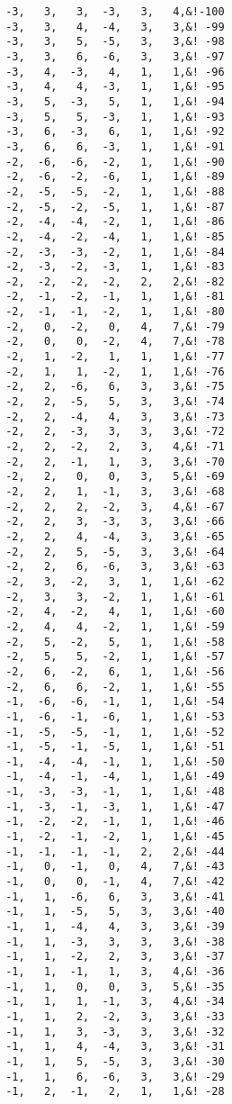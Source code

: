 \begin{Verbatim}
 -3,   3,   3,  -3,   3,   4,&!-100
 -3,   3,   4,  -4,   3,   3,&! -99
 -3,   3,   5,  -5,   3,   3,&! -98
 -3,   3,   6,  -6,   3,   3,&! -97
 -3,   4,  -3,   4,   1,   1,&! -96
 -3,   4,   4,  -3,   1,   1,&! -95
 -3,   5,  -3,   5,   1,   1,&! -94
 -3,   5,   5,  -3,   1,   1,&! -93
 -3,   6,  -3,   6,   1,   1,&! -92
 -3,   6,   6,  -3,   1,   1,&! -91
 -2,  -6,  -6,  -2,   1,   1,&! -90
 -2,  -6,  -2,  -6,   1,   1,&! -89
 -2,  -5,  -5,  -2,   1,   1,&! -88
 -2,  -5,  -2,  -5,   1,   1,&! -87
 -2,  -4,  -4,  -2,   1,   1,&! -86
 -2,  -4,  -2,  -4,   1,   1,&! -85
 -2,  -3,  -3,  -2,   1,   1,&! -84
 -2,  -3,  -2,  -3,   1,   1,&! -83
 -2,  -2,  -2,  -2,   2,   2,&! -82
 -2,  -1,  -2,  -1,   1,   1,&! -81
 -2,  -1,  -1,  -2,   1,   1,&! -80
 -2,   0,  -2,   0,   4,   7,&! -79
 -2,   0,   0,  -2,   4,   7,&! -78
 -2,   1,  -2,   1,   1,   1,&! -77
 -2,   1,   1,  -2,   1,   1,&! -76
 -2,   2,  -6,   6,   3,   3,&! -75
 -2,   2,  -5,   5,   3,   3,&! -74
 -2,   2,  -4,   4,   3,   3,&! -73
 -2,   2,  -3,   3,   3,   3,&! -72
 -2,   2,  -2,   2,   3,   4,&! -71
 -2,   2,  -1,   1,   3,   3,&! -70
 -2,   2,   0,   0,   3,   5,&! -69
 -2,   2,   1,  -1,   3,   3,&! -68
 -2,   2,   2,  -2,   3,   4,&! -67
 -2,   2,   3,  -3,   3,   3,&! -66
 -2,   2,   4,  -4,   3,   3,&! -65
 -2,   2,   5,  -5,   3,   3,&! -64
 -2,   2,   6,  -6,   3,   3,&! -63
 -2,   3,  -2,   3,   1,   1,&! -62
 -2,   3,   3,  -2,   1,   1,&! -61
 -2,   4,  -2,   4,   1,   1,&! -60
 -2,   4,   4,  -2,   1,   1,&! -59
 -2,   5,  -2,   5,   1,   1,&! -58
 -2,   5,   5,  -2,   1,   1,&! -57
 -2,   6,  -2,   6,   1,   1,&! -56
 -2,   6,   6,  -2,   1,   1,&! -55
 -1,  -6,  -6,  -1,   1,   1,&! -54
 -1,  -6,  -1,  -6,   1,   1,&! -53
 -1,  -5,  -5,  -1,   1,   1,&! -52
 -1,  -5,  -1,  -5,   1,   1,&! -51
 -1,  -4,  -4,  -1,   1,   1,&! -50
 -1,  -4,  -1,  -4,   1,   1,&! -49
 -1,  -3,  -3,  -1,   1,   1,&! -48
 -1,  -3,  -1,  -3,   1,   1,&! -47
 -1,  -2,  -2,  -1,   1,   1,&! -46
 -1,  -2,  -1,  -2,   1,   1,&! -45
 -1,  -1,  -1,  -1,   2,   2,&! -44
 -1,   0,  -1,   0,   4,   7,&! -43
 -1,   0,   0,  -1,   4,   7,&! -42
 -1,   1,  -6,   6,   3,   3,&! -41
 -1,   1,  -5,   5,   3,   3,&! -40
 -1,   1,  -4,   4,   3,   3,&! -39
 -1,   1,  -3,   3,   3,   3,&! -38
 -1,   1,  -2,   2,   3,   3,&! -37
 -1,   1,  -1,   1,   3,   4,&! -36
 -1,   1,   0,   0,   3,   5,&! -35
 -1,   1,   1,  -1,   3,   4,&! -34
 -1,   1,   2,  -2,   3,   3,&! -33
 -1,   1,   3,  -3,   3,   3,&! -32
 -1,   1,   4,  -4,   3,   3,&! -31
 -1,   1,   5,  -5,   3,   3,&! -30
 -1,   1,   6,  -6,   3,   3,&! -29
 -1,   2,  -1,   2,   1,   1,&! -28

\end{Verbatim}
